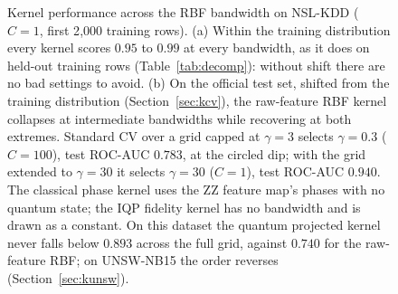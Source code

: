\documentclass[preprint,11pt]{elsarticle}
\begin{document}
\begin{figure}[t]
\caption{Kernel performance across the RBF bandwidth on NSL-KDD ($C=1$, first 2{,}000 training rows).
(a) Within the training distribution every kernel scores $0.95$ to $0.99$ at every bandwidth, as it does
on held-out training rows (Table~\ref{tab:decomp}): without shift there are no bad settings to avoid.
(b) On the official test set, shifted from the training distribution (Section~\ref{sec:kcv}), the
raw-feature RBF kernel collapses at intermediate bandwidths
while recovering at both extremes. Standard CV over a grid capped at $\gamma=3$ selects $\gamma=0.3$
($C=100$), test ROC-AUC $0.783$, at the circled dip; with the grid extended to $\gamma=30$ it selects
$\gamma=30$ ($C=1$), test ROC-AUC $0.940$. The classical phase kernel uses the ZZ feature map's phases with
no quantum state; the IQP fidelity kernel has no bandwidth and is drawn as a constant. On this dataset the
quantum projected kernel never falls below $0.893$ across the full grid, against $0.740$ for the
raw-feature RBF; on UNSW-NB15 the order reverses (Section~\ref{sec:kunsw}).}
\label{fig:landscape}
\end{figure}
\end{document}
